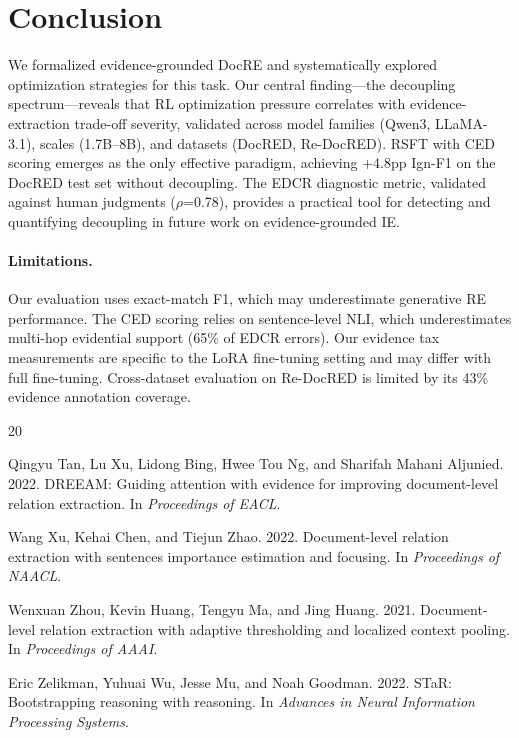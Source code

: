 \documentclass[11pt]{article}
\begin{document}
\section{Conclusion}

We formalized evidence-grounded DocRE and systematically explored optimization strategies for this task. Our central finding---the decoupling spectrum---reveals that RL optimization pressure correlates with evidence-extraction trade-off severity, validated across model families (Qwen3, LLaMA-3.1), scales (1.7B--8B), and datasets (DocRED, Re-DocRED). RSFT with CED scoring emerges as the only effective paradigm, achieving +4.8pp Ign-F1 on the DocRED test set without decoupling. The EDCR diagnostic metric, validated against human judgments ($\rho$=0.78), provides a practical tool for detecting and quantifying decoupling in future work on evidence-grounded IE.

\paragraph{Limitations.}
Our evaluation uses exact-match F1, which may underestimate generative RE performance. The CED scoring relies on sentence-level NLI, which underestimates multi-hop evidential support (65\% of EDCR errors). Our evidence tax measurements are specific to the LoRA fine-tuning setting and may differ with full fine-tuning. Cross-dataset evaluation on Re-DocRED is limited by its 43\% evidence annotation coverage.

\begin{thebibliography}{20}

Qingyu Tan, Lu Xu, Lidong Bing, Hwee Tou Ng, and Sharifah Mahani Aljunied. 2022.
DREEAM: Guiding attention with evidence for improving document-level relation extraction.
In \emph{Proceedings of EACL}.

Wang Xu, Kehai Chen, and Tiejun Zhao. 2022.
Document-level relation extraction with sentences importance estimation and focusing.
In \emph{Proceedings of NAACL}.

Wenxuan Zhou, Kevin Huang, Tengyu Ma, and Jing Huang. 2021.
Document-level relation extraction with adaptive thresholding and localized context pooling.
In \emph{Proceedings of AAAI}.

Eric Zelikman, Yuhuai Wu, Jesse Mu, and Noah Goodman. 2022.
STaR: Bootstrapping reasoning with reasoning.
In \emph{Advances in Neural Information Processing Systems}.

\end{thebibliography}
\end{document}
